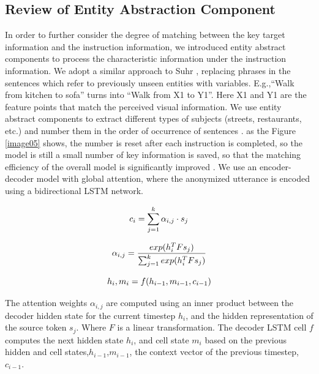 \subsection{Review of Entity Abstraction Component}
	
In order to further consider the degree of matching between the key target information and the instruction information, we introduced entity abstract components to process the characteristic information under the instruction information. We adopt a similar approach to Suhr \cite{suhr2018learning}, replacing phrases in the sentences which refer to previously unseen entities with variables. E.g.,“Walk from kitchen to sofa” turns into “Walk from X1 to Y1”. Here X1 and Y1 are the feature points that match the perceived visual information. We use entity abstract components to extract different types of subjects (streets, restaurants, etc.) and number them in the order of occurrence of sentences \cite{paz2019run}. as the Figure \ref{image05} shows, the number is reset after each instruction is completed, so the model is still a small number of key information is saved, so that the matching efficiency of the overall model is significantly improved \cite{iyer2017learning}. We use an encoder-decoder model with global attention, where the anonymized utterance is encoded using a bidirectional LSTM network.

\begin{equation}
	\centering
	{c}_{i} = \displaystyle\sum_{j=1}^k {\alpha}_{i, j} \cdot s_{j}
\end{equation}

\begin{equation}
	\centering
	{\alpha}_{i, j} = {\frac{exp({h_{i}^{T}Fs_{j}})}{\sum_{j=1}^{k}exp({h_{i}^{T}Fs_{j}})}}
\end{equation}

\begin{equation}
	\centering
	{h}_{i}, {m}_{i} = f({h}_{i-1}, {m}_{i-1}, {c}_{i-1})
\end{equation}

The attention weights ${\alpha}_{i, j}$ are computed using an inner product between the decoder hidden state for the current timestep ${h}_{i}$, and the hidden representation of the source token ${s}_{j}$. Where ${F}$ is a linear transformation. The decoder LSTM cell ${f}$ computes the next hidden state ${h}_{i}$, and cell state ${m}_{i}$ based on the previous hidden and cell states,${h}_{i-1}$,${m}_{i-1}$, the context vector of the previous timestep, ${c}_{i-1}$.

